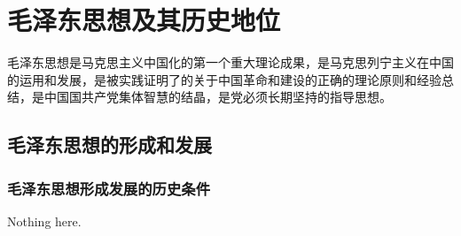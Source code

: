 \chapter{毛泽东思想及其历史地位}
\noindent 毛泽东思想是马克思主义中国化的第一个重大理论成果，是马克思列宁主义在中国的运用和发展，是被实践证明了的关于中国革命和建设的正确的理论原则和经验总结，是中国国共产党集体智慧的结晶，是党必须长期坚持的指导思想。

\section{毛泽东思想的形成和发展}

\subsection{毛泽东思想形成发展的历史条件}
Nothing here.

